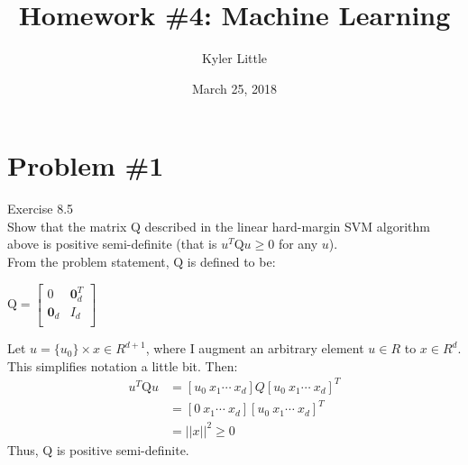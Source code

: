 \documentclass[12pt]{article}
\author{Kyler Little\vspace{-0.6cm}}
\title{Homework \#4: Machine Learning\vspace{-0.3cm}}
\date{March 25, 2018\vspace{-0.7cm}}
\begin{document}
	\maketitle
	\section*{Problem \#1}
		Exercise 8.5 \\ 
		Show that the matrix Q described in the linear hard-margin SVM algorithm above is positive semi-definite (that is $u^T \text{Q}u \ge 0$ for any $u$).\\
		From the problem statement, $\text{Q}$ is defined to be:
		\begin{center}
			$\text{Q} = \left[ 
			\begin{array}{cc}
			0 & \boldsymbol{0}_d^T \\
			\boldsymbol{0}_d & I_d\\
			\end{array}
			\right]$
		\end{center}
		Let $u = \{u_0 \} \times x \in R^{d+1}$, where I augment an arbitrary element $u \in R$ to $x \in R^d$. This simplifies notation a little bit. Then:
		\begin{align*}
			u^T\text{Q}u &= [u_0 \ x_1 \cdots \ x_d] Q [u_0 \ x_1 \cdots \ x_d]^T\\
			&=[0 \ x_1 \cdots \ x_d] [u_0 \ x_1 \cdots \ x_d]^T\\
			&= ||x||^2 \ge 0
		\end{align*}
		Thus, Q is positive semi-definite.
	 
\end{document}
